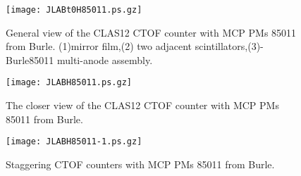 \newpage 
\begin{figure}[htbp]%
\begin{center}
\texttt{[image: JLABt0H85011.ps.gz]}
\end{center}
\caption{%
General view of the CLAS12 CTOF counter with MCP PMs 85011 from Burle.
(1)mirror film,(2) two adjacent scintillators,(3)-Burle85011 multi-anode assembly.
\label{JLABt0H85011}}
\end{figure}
\clearpage


\begin{figure}[htbp]%
\begin{center}
\texttt{[image: JLABH85011.ps.gz]}
\end{center}
\caption{%
The closer view of  the CLAS12 CTOF counter with MCP PMs 85011 from Burle. 
\label{JLABH85011}}
\end{figure}
\clearpage


\begin{figure}[htbp]%
\begin{center}
\texttt{[image: JLABH85011-1.ps.gz]}
\end{center}
\caption{%
Staggering CTOF counters with MCP PMs 85011 from Burle. 
\label{JLABH85011-1}}
\end{figure}
\clearpage

